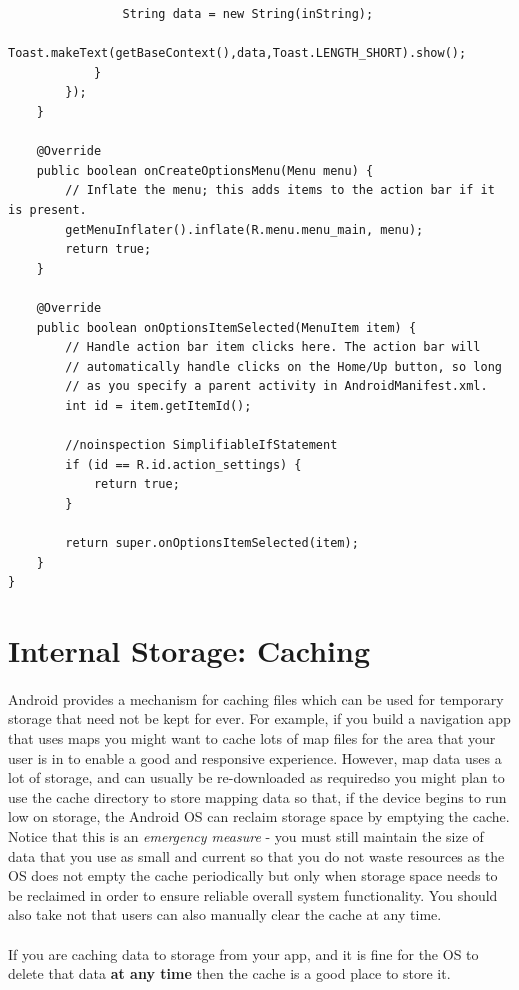 \begin{lstlisting}
                String data = new String(inString);
                Toast.makeText(getBaseContext(),data,Toast.LENGTH_SHORT).show();
            }
        });
    }

    @Override
    public boolean onCreateOptionsMenu(Menu menu) {
        // Inflate the menu; this adds items to the action bar if it is present.
        getMenuInflater().inflate(R.menu.menu_main, menu);
        return true;
    }

    @Override
    public boolean onOptionsItemSelected(MenuItem item) {
        // Handle action bar item clicks here. The action bar will
        // automatically handle clicks on the Home/Up button, so long
        // as you specify a parent activity in AndroidManifest.xml.
        int id = item.getItemId();

        //noinspection SimplifiableIfStatement
        if (id == R.id.action_settings) {
            return true;
        }

        return super.onOptionsItemSelected(item);
    }
}
\end{lstlisting}

\section{Internal Storage: Caching}
\paragraph{} Android provides a mechanism for caching files which can be used for temporary storage that need not be kept for ever. For example, if you build a navigation app that uses maps you might want to cache lots of map files for the area that your user is in to enable a good and responsive experience. However, map data uses a lot of storage, and can usually be re-downloaded as requiredso you might plan to use the cache directory to store mapping data so that, if the device begins to run low on storage, the Android OS can reclaim storage space by emptying the cache. Notice that this is an {\emph{emergency measure}} - you must still maintain the size of data that you use as small and current so that you do not waste resources as the OS does not empty the cache periodically but only when storage space needs to be reclaimed in order to ensure reliable overall system functionality. You should also take not that users can also manually clear the cache at any time.

\paragraph{} If you are caching data to storage from your app, and it is fine for the OS to delete that data {\bf{at any time}} then the cache is a good place to store it.

